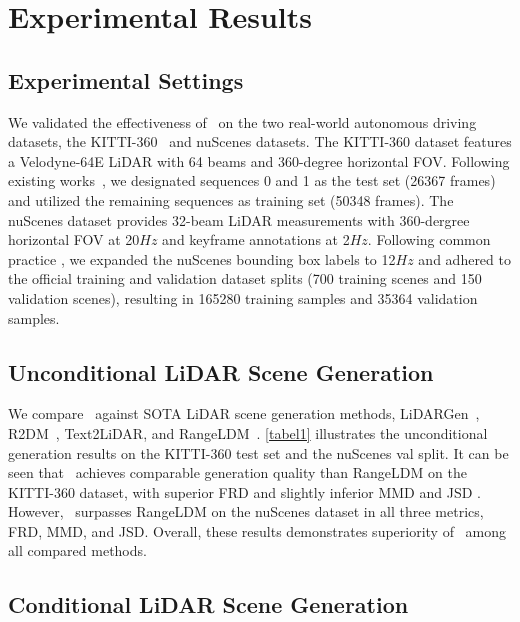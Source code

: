 \section{Experimental Results}
\subsection{Experimental Settings}

We validated the effectiveness of \sysname\ on the two real-world autonomous driving datasets, the KITTI-360~\cite{Liao2022PAMI} and nuScenes \cite{nuscenes2019} datasets.
The KITTI-360 dataset features a Velodyne-64E LiDAR with 64 beams and 360-degree horizontal FOV. Following existing works~\cite{nakashima2024lidar, wu2024text2lidar}, we designated sequences 0 and 1 as the test set (26367 frames) and utilized the remaining sequences as training set (50348 frames). 
The nuScenes dataset provides 32-beam LiDAR measurements with 360-dergree horizontal FOV  at 20$\si{Hz}$ and keyframe annotations at 2$\si{Hz}$. 
Following common practice \cite{gao2023magicdrive}, we expanded the nuScenes bounding box labels to 12$\si{Hz}$ and adhered to the official training and validation dataset splits (700 training scenes and 150 validation scenes), resulting in 165280 training samples and 35364 validation samples.



\subsection{Unconditional LiDAR Scene Generation}
\label{sec_single_frame}

We compare \sysname\ against SOTA LiDAR scene generation methods,
LiDARGen~\cite{zyrianov2022learning}, R2DM~\cite{nakashima2024lidar}, Text2LiDAR\cite{wu2024text2lidar}, and RangeLDM~\cite{hu2025rangeldm}. 
\cref{tabel1} illustrates the unconditional generation results on the KITTI-360 test set and the nuScenes val split. 
It can be seen that \sysname\ achieves comparable generation quality than RangeLDM on the KITTI-360 dataset, with superior FRD \cite{wu2024text2lidar} and slightly inferior MMD \cite{nakashima2024lidar} and JSD \cite{nakashima2024lidar}. However, \sysname\ surpasses RangeLDM on the nuScenes dataset in all three metrics, FRD, MMD, and JSD. Overall, these results demonstrates superiority of \sysname\ among all compared methods.


\subsection{Conditional LiDAR Scene Generation}
\label{sec_conditional_generation}

